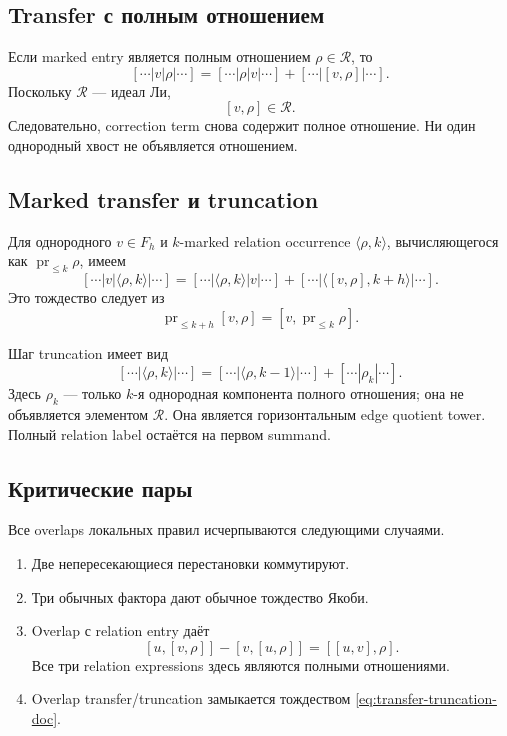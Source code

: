 \documentclass[11pt,a4paper]{article}
\theoremstyle{definition}
\theoremstyle{remark}
\newcommand{\pr}{\operatorname{pr}}
\newcommand{\Rel}{\mathcal R}
\begin{document}
\subsection{Transfer с полным отношением}

Если marked entry является полным отношением $\rho\in\Rel$, то
\begin{equation}\label{eq:relation-transfer}
 [\cdots|v|\rho|\cdots]
 =
 [\cdots|\rho|v|\cdots]
 +[\cdots|[v,\rho]|\cdots].
\end{equation}
Поскольку $\Rel$ --- идеал Ли,
\[
 [v,\rho]\in\Rel.
\]
Следовательно, correction term снова содержит полное отношение. Ни один
однородный хвост не объявляется отношением.

\subsection{Marked transfer и truncation}

Для однородного $v\in F_h$ и $k$-marked relation occurrence
$\langle\rho,k\rangle$, вычисляющегося как $\pr_{\le k}\rho$, имеем
\begin{equation}\label{eq:marked-transfer-doc}
 [\cdots|v|\langle\rho,k\rangle|\cdots]
 =
 [\cdots|\langle\rho,k\rangle|v|\cdots]
 +[\cdots|\langle[v,\rho],k+h\rangle|\cdots].
\end{equation}
Это тождество следует из
\begin{equation}\label{eq:transfer-truncation-doc}
 \pr_{\le k+h}[v,\rho]
 =[v,\pr_{\le k}\rho].
\end{equation}

Шаг truncation имеет вид
\begin{equation}\label{eq:marked-truncation-doc}
 [\cdots|\langle\rho,k\rangle|\cdots]
 =
 [\cdots|\langle\rho,k-1\rangle|\cdots]
 +[\cdots|\rho_k|\cdots].
\end{equation}
Здесь $\rho_k$ --- только $k$-я однородная компонента полного отношения; она
не объявляется элементом $\Rel$. Она является горизонтальным edge quotient
tower. Полный relation label остаётся на первом summand.

\subsection{Критические пары}

Все overlaps локальных правил исчерпываются следующими случаями.

\begin{enumerate}
\item Две непересекающиеся перестановки коммутируют.
\item Три обычных фактора дают обычное тождество Якоби.
\item Overlap с relation entry даёт
\begin{equation}\label{eq:relation-jacobi-doc}
 [u,[v,\rho]]-[v,[u,\rho]]=[[u,v],\rho].
\end{equation}
Все три relation expressions здесь являются полными отношениями.
\item Overlap transfer/truncation замыкается тождеством
\eqref{eq:transfer-truncation-doc}.
\end{enumerate}
\end{document}
